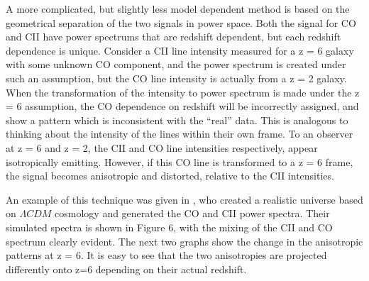 \documentclass[manuscript]{aastex}
\begin{document}
A more complicated, but slightly less model dependent method is based on the geometrical separation of the two signals in power space. Both the signal for CO and CII have power spectrums that are redshift dependent, but each redshift dependence is unique. Consider a CII line intensity measured for a z = 6 galaxy with some unknown CO component, and the power spectrum is created under such an assumption, but the CO line intensity is actually from a z = 2 galaxy. When the transformation of the intensity to power spectrum is made under the z = 6 assumption, the CO dependence on redshift will be incorrectly assigned, and show a pattern which is inconsistent with the ``real'' data. This is analogous to thinking about the intensity of the lines within their own frame. To an observer at z = 6 and z = 2, the CII and CO line intensities respectively, appear isotropically emitting. However, if this CO line is transformed to a z = 6 frame, the signal becomes anisotropic and distorted, relative to the CII intensities.  


An example of this technique was given in \cite{Cheng2016}, who created a realistic universe based on $\Lambda CDM$ cosmology and generated the CO and CII power spectra. Their simulated spectra is shown in Figure 6, with the mixing of the CII and CO spectrum clearly evident. The next two graphs show the change in the anisotropic patterns at z = 6. It is easy to see that the two anisotropies are projected differently onto z=6 depending on their actual redshift.
\end{document}
